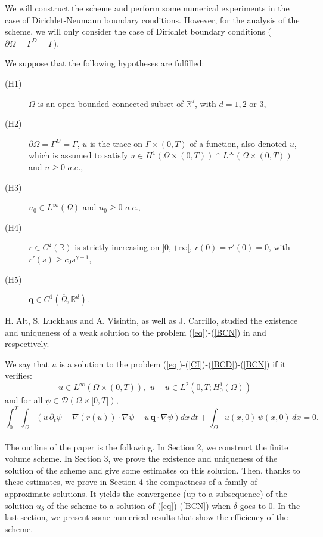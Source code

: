 \documentclass[smallextended]{svjour3}
\def\pa{\partial}
\def\pa{\partial}
\begin{document}
\begin{remark}
We will construct the scheme and perform some numerical experiments in the case of Dirichlet-Neumann boundary conditions. However, for the analysis of the scheme, we will only consider the case of Dirichlet boundary conditions ($\pa\Omega=\Gamma^{D}=\Gamma$).
\end{remark}

We suppose that the following hypotheses are fulfilled:
\begin{description}
\item[(H1)] $\Omega$ is an open bounded connected subset of $\mathbb{R}^{d}$, with $d=1,2$ or $3$,
\item[(H2)] $\pa\Omega=\Gamma^{D}=\Gamma$, $\overline{u}$ is the trace on $\Gamma \times (0,T)$ of a function, also denoted $\overline{u}$, which is assumed to satisfy $\overline{u} \in H^{1}(\Omega \times (0,T))\cap L^{\infty}(\Omega \times (0,T))$ and $\overline{u} \geq 0\textit{ a.e.}$,
\item[(H3)] $u_{0} \in L^{\infty}(\Omega)$ and $u_{0} \geq 0 \textit{ a.e.}$,
\item[(H4)] $r \in C^{2}(\mathbb{R})$ is strictly increasing on $]0,+\infty[$, $r(0)=r'(0)=0$, with $r'(s)\geq c_{0}s^{\gamma-1}$,
\item[(H5)] $\mathbf{q} \in C^{1}(\overline{\Omega},\mathbb{R}^{d})$.
\end{description}
H. Alt, S. Luckhaus and A. Visintin, as well as J. Carrillo, studied the existence and uniqueness of a weak solution to the problem (\ref{eq})-(\ref{BCN}) in \cite{Alt1984} and \cite{Carrillo1999} respectively.

\begin{definition}
We say that $u$ is a solution to the problem (\ref{eq})-(\ref{CI})-(\ref{BCD})-(\ref{BCN}) if it verifies:
\begin{equation*}
u \in L^{\infty}(\Omega \times (0,T)),\,\ u-\overline{u} \in L^{2}(0,T;H^{1}_{0}(\Omega))
\end{equation*}
and for all $\psi \in \mathcal{D}(\Omega \times [0,T[)$,
\begin{equation}
\int_{0}^{T}\int_{\Omega}\left( u \, \pa_{t}\psi - \nabla(r(u))\cdot \nabla\psi+ u \, \mathbf{q}\cdot \nabla\psi \right) dx \, dt + \int_{\Omega}u(x,0)\,\psi(x,0)\,dx=0.
\label{defsol}
\end{equation}
\label{defisol}
\end{definition}

\paragraph*{} The outline of the paper is the following. In Section 2, we construct the finite volume scheme. In Section 3, we prove the existence and uniqueness of the solution of the scheme and give some estimates on this solution. Then, thanks to these estimates, we prove in Section 4 the compactness of a family of approximate solutions. It yields the convergence (up to a subsequence) of the solution $u_{\delta}$ of the scheme to a solution of (\ref{eq})-(\ref{BCN}) when $\delta$ goes to 0. 
In the last section, we present some numerical results that show the efficiency of the scheme.
\end{document}
